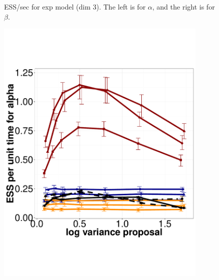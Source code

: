 \begin{figure}
\begin{minipage}[hp]{0.45\linewidth}
    \vspace{-0 in}
  \end{minipage}
    \caption{ESS/sec for exp model (dim 3). The left is for $\alpha$, and the right is for $\beta$.}
     \label{fig:ESS_EXP_D3}
  \end{figure}
  \begin{figure}%
  \centering
  \begin{minipage}[!hp]{0.45\linewidth}
  \centering
    \includegraphics [width=0.90\textwidth, angle=0]{figs/exp_10_alpha.pdf}
      \end{minipage}
  \begin{minipage}[hp]{0.45\linewidth}
  \centering

\end{minipage}
\end{figure}
